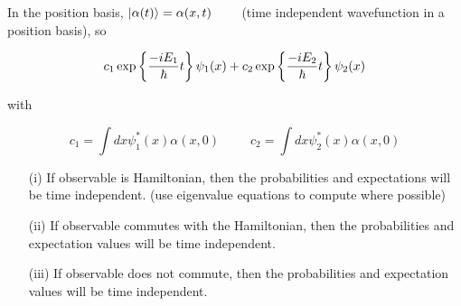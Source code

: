 \documentclass[english, 11pt]{article}
\begin{document}
      In the position basis, $\left|\alpha(t)\right\rangle = \alpha(x,t)$  \ \ \ \ (time independent wavefunction in a position basis), so

      \[ c_1 \exp \left\{ \frac{-iE_1}{\hbar}t \right\} \psi_1(x) + c_2\exp \left\{ \frac{-iE_2}{\hbar}t \right\}\psi_2(x)\]

      with

      \[ c_1 = \int dx \psi_1^*(x)\alpha(x,0) \ \ \ \ \ \  \ \ \ \ \ c_2 = \int dx \psi_2^*(x)\alpha(x,0) \]

      \begin{itemize}
        \item[(i)] If observable is Hamiltonian, then the probabilities and expectations will be time independent. (use eigenvalue equations to compute where possible)
        \item[(ii)] If observable commutes with the Hamiltonian, then the probabilities and expectation values will be time independent.
        \item[(iii)] If observable does not commute, then the probabilities and expectation values will be time independent.
      \end{itemize}
\end{document}
